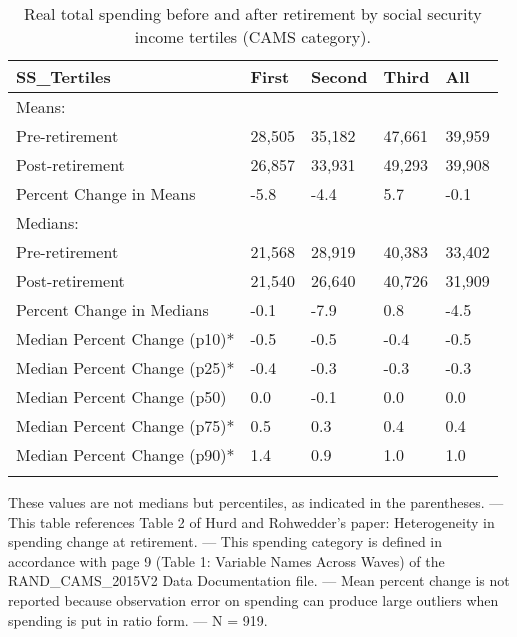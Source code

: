 \begin{table}[tbp] \centering
{}

\caption{Real total spending before and after retirement by social security income tertiles (CAMS category).}
\begin{tabularx}{\textwidth}{lCCCC}

\toprule
{SS\_Tertiles}&{First}&{Second}&{Third}&{All} \tabularnewline
\midrule\addlinespace[1.5ex]
Means:&&&& \tabularnewline
\midrule Pre-retirement&28,505&35,182&47,661&39,959 \tabularnewline
Post-retirement&26,857&33,931&49,293&39,908 \tabularnewline
Percent Change in Means&-5.8&-4.4&5.7&-0.1 \tabularnewline
\midrule Medians:&&&& \tabularnewline
\midrule Pre-retirement&21,568&28,919&40,383&33,402 \tabularnewline
Post-retirement&21,540&26,640&40,726&31,909 \tabularnewline
Percent Change in Medians&-0.1&-7.9&0.8&-4.5 \tabularnewline
Median Percent Change (p10)*&-0.5&-0.5&-0.4&-0.5 \tabularnewline
Median Percent Change (p25)*&-0.4&-0.3&-0.3&-0.3 \tabularnewline
Median Percent Change (p50)&0.0&-0.1&0.0&0.0 \tabularnewline
Median Percent Change (p75)*&0.5&0.3&0.4&0.4 \tabularnewline
Median Percent Change (p90)*&1.4&0.9&1.0&1.0 \tabularnewline
\bottomrule \addlinespace[1.5ex]

\end{tabularx}
\begin{flushleft}
\footnotesize *These values are not medians but percentiles, as indicated in the parentheses. \linebreak --- \linebreak This table references Table 2 of Hurd and Rohwedder's paper: Heterogeneity in spending change at retirement. \linebreak --- \linebreak This spending category is defined in accordance with page 9 (Table 1: Variable Names Across Waves) of the RAND\_CAMS\_2015V2 Data Documentation file. \linebreak --- \linebreak Mean percent change is not reported because observation error on spending can produce large outliers when spending is put in ratio form. \linebreak --- \linebreak N = 919.
\end{flushleft}
\end{table}
